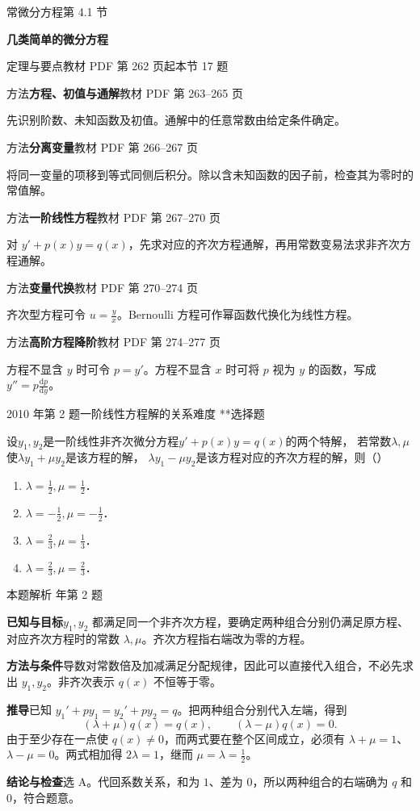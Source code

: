 \documentclass[UTF8,zihao=-4,fontset=fandol]{ctexart}
\newcommand{\SectionHeading}[4]{%
  \clearpage\hypertarget{sec-#1}{}%
  {\small\textcolor{accent}{#2\hfill 第 #1 节}}\par\medskip
  {\LARGE\bfseries #3}\par\smallskip
  {\small\textcolor{muted}{#4}}\par\bigskip}
\newcommand{\Theory}[4]{%
  {\small\textcolor{accent}{#1}\quad\textbf{#3}\hfill\textcolor{muted}{教材 PDF 第 #2 页}}\par
  {\small #4}\par\smallskip}
\newcommand{\pickout}{\hfill（\hspace{1.4em}）}
\newenvironment{abcd}{\begin{enumerate}[label=\textup{(\Alph*)},leftmargin=2.3em,itemsep=1pt,topsep=4pt,parsep=1pt]}{\end{enumerate}}
\newcounter{BankQuestion}
\newcommand{\QuestionPage}[7]{%
  \stepcounter{BankQuestion}%
  \par\noindent\begin{minipage}{\linewidth}
  \raggedright
  {\small\textcolor{black!60}{#3\quad #5\quad 难度 #7}\hfill\textcolor{accent}{#2}}\par\smallskip}
\newcommand{\QuestionEnd}{\end{minipage}\par\medskip}
\newcommand{\QuestionPage}[7]{%
  \clearpage
  \stepcounter{BankQuestion}%
  {\small\textcolor{accent}{#1\hfill #2}}\par\medskip
  {\small\textcolor{black!60}{#3\quad #5\quad 难度 #7\hfill \arabic{BankQuestion} / 234}}\par\vspace{9bp}}
\newcommand{\QuestionEnd}{}
\newenvironment{QuestionSolution}[1]{%
  \clearpage
  {\small\textcolor{black!60}{本题解析\quad #1}}\par\medskip
}{\par\clearpage}
\begin{document}
\SectionHeading{4.1}{常微分方程}{几类简单的微分方程}{定理与要点\quad 教材 PDF 第 262 页起\hfill 本节 17 题}
\Theory{方法}{263--265}{方程、初值与通解}{先识别阶数、未知函数及初值。通解中的任意常数由给定条件确定。}
\Theory{方法}{266--267}{分离变量}{将同一变量的项移到等式同侧后积分。除以含未知函数的因子前，检查其为零时的常值解。}
\Theory{方法}{267--270}{一阶线性方程}{对 \(y'+p(x)y=q(x)\)，先求对应的齐次方程通解，再用常数变易法求非齐次方程通解。}
\Theory{方法}{270--274}{变量代换}{齐次型方程可令 \(u=\frac{y}{x}\)。Bernoulli 方程可作幂函数代换化为线性方程。}
\Theory{方法}{274--277}{高阶方程降阶}{方程不显含 \(y\) 时可令 \(p=y'\)。方程不显含 \(x\) 时可将 \(p\) 视为 \(y\) 的函数，写成 \(y''=p\frac{\mathrm{d}p}{\mathrm{d}y}\)。}
\QuestionPage{4.1 几类简单的微分方程}{选择题}{2010 年第 2 题}{1}{一阶线性方程解的关系}{202 / 234}{**}
设$y_1,y_2$是一阶线性非齐次微分方程$y' + p(x)y = q(x)$的两个特解，
若常数$\lambda ,\mu$使$\lambda y_1 + \mu y_2$是该方程的解，
$\lambda y_1 - \mu y_2$是该方程对应的齐次方程的解，则\pickout{}
\begin{abcd}
\item $\lambda = \frac{1}{2},\mu = \frac{1}{2}$．
\item $\lambda = - \frac{1}{2},\mu = - \frac{1}{2}$．
\item $\lambda = \frac{2}{3},\mu = \frac{1}{3}$．
\item $\lambda = \frac{2}{3},\mu = \frac{2}{3}$．
\end{abcd}
\QuestionEnd

\begin{QuestionSolution}{2010 年第 2 题}
\textbf{已知与目标}\quad \(y_1,y_2\) 都满足同一个非齐次方程，要确定两种组合分别仍满足原方程、对应齐次方程时的常数 \(\lambda,\mu\)。齐次方程指右端改为零的方程。

\textbf{方法与条件}\quad 导数对常数倍及加减满足分配规律，因此可以直接代入组合，不必先求出 \(y_1,y_2\)。非齐次表示 \(q(x)\) 不恒等于零。

\textbf{推导}\quad 已知 \(y_1'+py_1=y_2'+py_2=q\)。把两种组合分别代入左端，得到
\[
(\lambda+\mu)q(x)=q(x),\qquad(\lambda-\mu)q(x)=0.
\]
由于至少存在一点使 \(q(x)\ne0\)，而两式要在整个区间成立，必须有 \(\lambda+\mu=1\)、\(\lambda-\mu=0\)。两式相加得 \(2\lambda=1\)，继而 \(\mu=\lambda=\frac{1}{2}\)。

\textbf{结论与检查}\quad 选 A。代回系数关系，和为 \(1\)、差为 \(0\)，所以两种组合的右端确为 \(q\) 和 \(0\)，符合题意。
\end{QuestionSolution}
\end{document}
